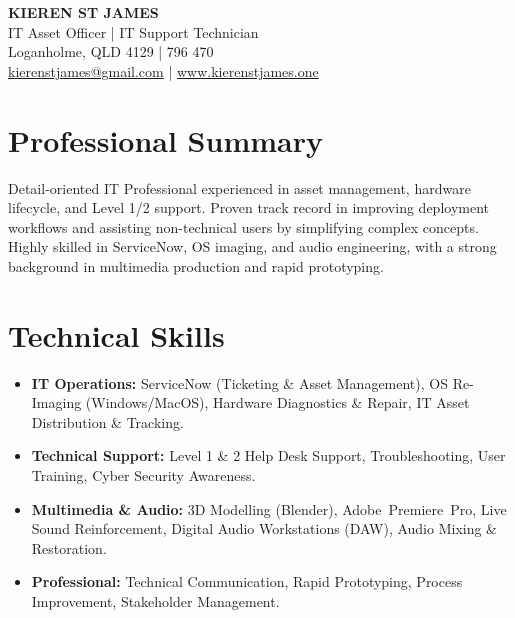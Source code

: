 \documentclass[11pt, a4paper]{article}
\begin{document}
\raggedright %

\begin{center}
    {\Huge\sffamily \textbf{KIEREN ST JAMES}} \\
    \vspace{2pt}
    {\large\sffamily\color{accent} IT Asset Officer | IT Support Technician} \\
    \vspace{4pt}
    {\sffamily Loganholme, QLD 4129 \quad |  796 470} \\
    {\sffamily \href{mailto:kierenstjames@gmail.com}{kierenstjames@gmail.com} \quad | \quad \href{http://www.kierenstjames.one}{www.kierenstjames.one}}
\end{center}

\section{Professional Summary}
Detail-oriented IT Professional experienced in asset management, hardware lifecycle, and Level 1/2 support. Proven track record in improving deployment workflows and assisting non-technical users by simplifying complex concepts. Highly skilled in ServiceNow, OS imaging, and audio engineering, with a strong background in multimedia production and rapid prototyping.

\section{Technical Skills}
\begin{itemize}
    \item \textbf{IT Operations:} ServiceNow (Ticketing \& Asset Management), OS Re-Imaging (Windows/MacOS), Hardware Diagnostics \& Repair, IT Asset Distribution \& Tracking.
    \item \textbf{Technical Support:} Level 1 \& 2 Help Desk Support, Troubleshooting, User Training, Cyber Security Awareness.
    \item \textbf{Multimedia \& Audio:} 3D Modelling (Blender), \mbox{Adobe Premiere Pro}, Live Sound Reinforcement, Digital Audio Workstations (DAW), Audio Mixing \& Restoration.
    \item \textbf{Professional:} Technical Communication, Rapid Prototyping, Process Improvement, Stakeholder Management.
\end{itemize}
\end{document}
